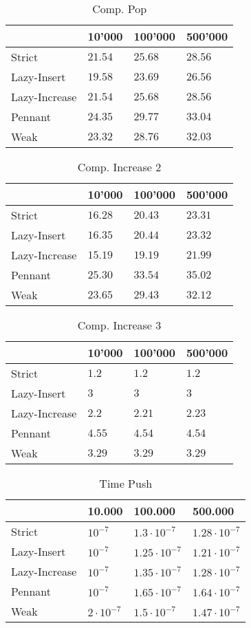 \documentclass{DIKU-article}[2010/01/13]
\begin{document}
\begin{table}[h!]
\centering
\caption{Comp. Pop}
\begin{tabular}{l|lll}
 & 10'000 & 100'000 & 500'000 \\
\hline
Strict & $21.54$ & $25.68$ & $28.56$ \\
Lazy-Insert & $19.58$ & $23.69$ & $26.56$ \\
Lazy-Increase & $21.54$ & $25.68$ & $28.56$ \\
Pennant & $24.35$ & $29.77$ & $33.04$ \\
Weak & $23.32$ & $28.76$ & $32.03$

\end{tabular}
\end{table}

\begin{table}[h!]
\centering
\caption{Comp. Increase 2}
\begin{tabular}{l|lll}
& 10'000 & 100'000 & 500'000 \\
\hline
Strict & $16.28$ & $20.43$ & $23.31$ \\
Lazy-Insert & $16.35$ & $20.44$ & $23.32$ \\
Lazy-Increase & $15.19$ & $19.19$ & $21.99$ \\
Pennant & $25.30$ & $33.54$ & $35.02$ \\
Weak & $23.65$ & $29.43$ & $32.12$

\end{tabular}
\end{table}

\begin{table}[h!]
\centering
\caption{Comp. Increase 3}
\begin{tabular}{l|lll}
\label{tab:comp.last}
& 10'000 & 100'000 & 500'000 \\
\hline
Strict & $1.2$ & $1.2$ & $1.2$ \\
Lazy-Insert & $3$ & $3$ & $3$ \\
Lazy-Increase & $2.2$ & $2.21$ & $2.23$ \\
Pennant & $4.55$ & $4.54$ & $4.54$ \\
Weak & $3.29$ & $3.29$ & $3.29$


\end{tabular}
\end{table}


\begin{table}[h!]
\centering
\caption{Time Push}
\begin{tabular}{l|lll}
\label{tab:time.first}
  & 10.000 & 100.000 & 500.000 \\
  \hline
  Strict & $10^{-7}$ & $1.3\cdot 10^{-7}$ & $1.28\cdot 10^{-7}$\\
  Lazy-Insert & $10^{-7}$ & $1.25\cdot 10^{-7}$ & $1.21\cdot 10^{-7}$\\
  Lazy-Increase & $10^{-7}$ & $1.35\cdot 10^{-7}$ & $1.28\cdot 10^{-7}$\\
  Pennant & $10^{-7}$ & $1.65\cdot 10^{-7}$ & $1.64\cdot 10^{-7}$\\
  Weak & $2\cdot 10^{-7}$ & $1.5\cdot 10^{-7}$ & $1.47\cdot 10^{-7}$

\end{tabular}
\end{table}
\end{document}
